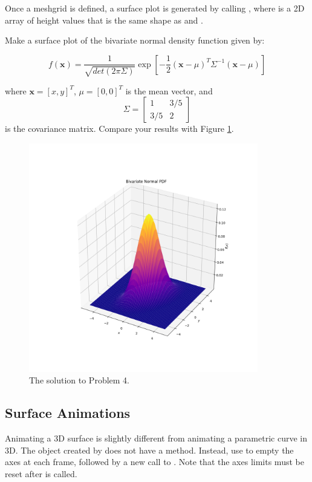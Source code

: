 Once a meshgrid is defined, a surface plot is generated by calling , where  is a 2D array of height values that is the same shape as  and . 

\begin{problem}
Make a surface plot of the bivariate normal density function given by:

$$f(\mathbf{x})=\frac{1}{\sqrt{det(2\pi \Sigma)}}\exp{\left[-\frac{1}{2}(\mathbf{x} - \mu)^T \Sigma^{-1} (\mathbf{x} - \mu)\right]}$$

where $\mathbf{x}=[x,y]^T$, $\mu=[0,0]^T$ is the mean vector, and $$\Sigma = \begin{bmatrix} 1 & 3/5 \\ 3/5 & 2 \end{bmatrix}$$ is the covariance matrix. Compare your results with Figure \ref{lab0:surf}.
\end{problem}

\begin{figure}[H]
\centering
\includegraphics[width=100mm]{figures/normal_density.png}
\caption{The solution to Problem 4.}
\label{lab0:surf}
\end{figure}

\subsection*{Surface Animations}
Animating a 3D surface is slightly different from animating a parametric curve in 3D.
The object created by  does not have a  method.
Instead, use  to empty the axes at each frame, followed by a new call to .
Note that the axes limits must be reset after  is called. 

